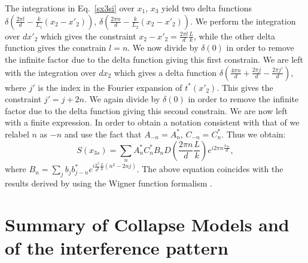\documentclass[12pt,groupedaddress,pra,aps]{revtex4-1}
\begin{document}
The integrations in Eq.~\eqref{sx3si} over $x_1$, $x_3$ yield two delta functions $\delta(\frac{2\pi l}{d} - \frac{k}{L_1}(x_2-x'_2))$, $\delta(\frac{2\pi n}{d} - \frac{k}{L_2}(x_2-x'_2))$. We perform the integration over $dx'_2$ which gives the constraint $x_2-x'_2=\frac{2\pi l}{d}\frac{L}{k}$, while the other delta function gives the constrain $l=n$. We now divide by $\delta(0)$ in order to remove the infinite factor due to the delta function giving this first constrain. We are left with the integration over $dx_2$ which gives a delta function $\delta(\frac{4\pi n}{d} + \frac{2\pi j}{d} - \frac{2\pi j'}{d})$, where $j'$ is the index in the Fourier expansion of $t^*(x'_2)$. This gives the constraint $j'=j+2n$.  We again divide by $\delta(0)$ in order to remove the infinite factor due to the delta function giving this second constrain. We are now left with a finite expression. In order to obtain a notation consistent with that of \cite{1464-4266-5-2-362} we relabel $n$ as $-n$ and use the fact that $A_{-n}=A^*_n$, $C_{-n}=C^*_n$. Thus we obtain:
\begin{equation}\label{p3_near}
S(x_{3s})=\sum_n A^*_n C^*_n B_n D\left(\frac{2\pi n }{d}\frac{L}{k}\right) e^{i 2 \pi n \frac{x_{3s}}{d}},
\end{equation}
where $B_n=\sum_j b_j b^*_{j-n} e^{i \frac{\pi^2}{d^2} \frac{L}{k}(n^2-2nj)}$.
The above equation coincides with the results derived by using the Wigner function formalism \cite{PhysRevA.83.043621,PhysRevA.70.053608}. 

\clearpage
\section{Summary of Collapse Models and of the interference pattern}\label{socm}
\end{document}
